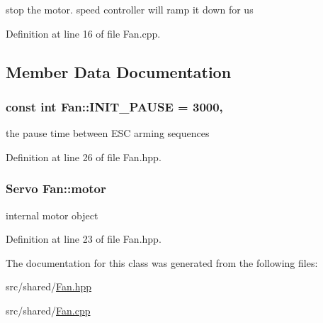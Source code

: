 stop the motor. speed controller will ramp it down for us 



Definition at line 16 of file Fan.\-cpp.



\subsection{Member Data Documentation}
\hypertarget{classFan_a8d7eb0f5de190ffc2f5d0ae1c5c10e29}{
\subsubsection[{I\-N\-I\-T\-\_\-\-P\-A\-U\-S\-E}]{\setlength{\rightskip}{0pt plus 5cm}const int Fan\-::\-I\-N\-I\-T\-\_\-\-P\-A\-U\-S\-E = 3000\hspace{0.3cm}{\ttfamily [static]}, {\ttfamily [private]}}}\label{classFan_a8d7eb0f5de190ffc2f5d0ae1c5c10e29}


the pause time between E\-S\-C arming sequences 



Definition at line 26 of file Fan.\-hpp.

\hypertarget{classFan_aff9de16d110a96ff5788f7d6ad6ef715}{
\subsubsection[{motor}]{\setlength{\rightskip}{0pt plus 5cm}Servo Fan\-::motor\hspace{0.3cm}{\ttfamily [private]}}}\label{classFan_aff9de16d110a96ff5788f7d6ad6ef715}


internal motor object 



Definition at line 23 of file Fan.\-hpp.



The documentation for this class was generated from the following files\-:\begin{DoxyCompactItemize}
\item 
src/shared/\hyperlink{Fan_8hpp}{Fan.\-hpp}\item 
src/shared/\hyperlink{Fan_8cpp}{Fan.\-cpp}\end{DoxyCompactItemize}
